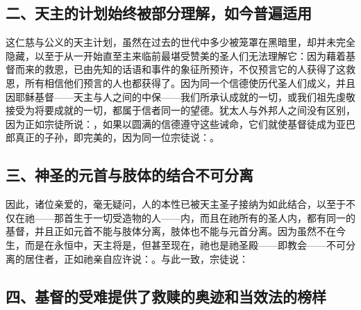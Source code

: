 
\subsection{二、天主的计划始终被部分理解，如今普遍适用}

这仁慈与公义的天主计划，虽然在过去的世代中多少被笼罩在黑暗里，却并未完全隐藏，以至于从一开始直至主来临前最堪受赞美的圣人们无法理解它：因为藉着基督而来的救恩，已由先知的话语和事件的象征所预许，不仅预言它的人获得了这救恩，所有相信他们预言的人也都获得了。因为同一个信德使历代圣人们成义，并且因耶稣基督——天主与人之间的中保——我们所承认成就的一切，或我们祖先虔敬接受为将要成就的一切，都属于信者同一的望德。犹太人与外邦人之间没有区别，因为正如宗徒所说：，如果以圆满的信德遵守这些诫命，它们就使基督徒成为亚巴郎真正的子孙，即完美的，因为同一位宗徒说：。\par


\subsection{三、神圣的元首与肢体的结合不可分离}

因此，诸位亲爱的，毫无疑问，人的本性已被天主圣子接纳为如此结合，以至于不仅在祂——那首生于一切受造物的人——内，而且在祂所有的圣人内，都有同一的基督，并且正如元首不能与肢体分离，肢体也不能与元首分离。因为虽然不在今生，而是在永恒中，天主将是，但甚至现在，祂也是祂圣殿——即教会——不可分离的居住者，正如祂亲自应许说：。与此一致，宗徒说： \par


\subsection{四、基督的受难提供了救赎的奥迹和当效法的榜样}

